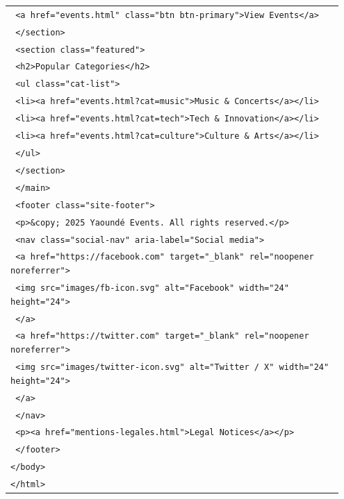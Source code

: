 \documentclass[11pt]{article}
\begin{document}
\begin{exoresolu}
\begin{center}
\begin{tabular}{|p{0.95\linewidth}|}
\texttt{      <a href="events.html" class="btn btn-primary">View Events</a>}\\
\texttt{    </section>}\\
\texttt{    <section class="featured">}\\
\texttt{      <h2>Popular Categories</h2>}\\
\texttt{      <ul class="cat-list">}\\
\texttt{        <li><a href="events.html?cat=music">Music \& Concerts</a></li>}\\
\texttt{        <li><a href="events.html?cat=tech">Tech \& Innovation</a></li>}\\
\texttt{        <li><a href="events.html?cat=culture">Culture \& Arts</a></li>}\\
\texttt{      </ul>}\\
\texttt{    </section>}\\
\texttt{  </main>}\\
\texttt{  <footer class="site-footer">}\\
\texttt{    <p>\&copy; 2025 Yaoundé Events. All rights reserved.</p>}\\
\texttt{    <nav class="social-nav" aria-label="Social media">}\\
\texttt{      <a href="https://facebook.com" target="\_blank" rel="noopener noreferrer">}\\
\texttt{        <img src="images/fb-icon.svg" alt="Facebook" width="24" height="24">}\\
\texttt{      </a>}\\
\texttt{      <a href="https://twitter.com" target="\_blank" rel="noopener noreferrer">}\\
\texttt{        <img src="images/twitter-icon.svg" alt="Twitter / X" width="24" height="24">}\\
\texttt{      </a>}\\
\texttt{    </nav>}\\
\texttt{    <p><a href="mentions-legales.html">Legal Notices</a></p>}\\
\texttt{  </footer>}\\
\texttt{</body>}\\
\texttt{</html>}\\\hline
\end{tabular}
\end{center}


\end{exoresolu}
\end{document}
